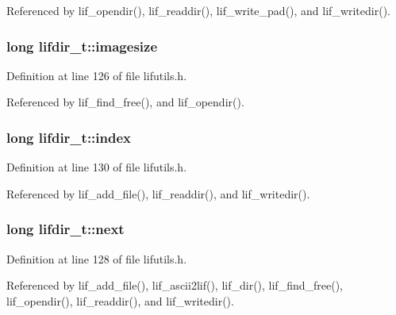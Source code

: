 Referenced by lif\+\_\+opendir(), lif\+\_\+readdir(), lif\+\_\+write\+\_\+pad(), and lif\+\_\+writedir().

\subsubsection[{\texorpdfstring{imagesize}{imagesize}}]{\setlength{\rightskip}{0pt plus 5cm}long lifdir\+\_\+t\+::imagesize}\hypertarget{structlifdir__t_a2cae1515444f013eaf439333e3952b1d}{}\label{structlifdir__t_a2cae1515444f013eaf439333e3952b1d}


Definition at line 126 of file lifutils.\+h.



Referenced by lif\+\_\+find\+\_\+free(), and lif\+\_\+opendir().

\subsubsection[{\texorpdfstring{index}{index}}]{\setlength{\rightskip}{0pt plus 5cm}long lifdir\+\_\+t\+::index}\hypertarget{structlifdir__t_a7b9b45ee1a56ba386158da051605a8bd}{}\label{structlifdir__t_a7b9b45ee1a56ba386158da051605a8bd}


Definition at line 130 of file lifutils.\+h.



Referenced by lif\+\_\+add\+\_\+file(), lif\+\_\+readdir(), and lif\+\_\+writedir().

\subsubsection[{\texorpdfstring{next}{next}}]{\setlength{\rightskip}{0pt plus 5cm}long lifdir\+\_\+t\+::next}\hypertarget{structlifdir__t_a52a7520a6393d4782afb0ccd42899215}{}\label{structlifdir__t_a52a7520a6393d4782afb0ccd42899215}


Definition at line 128 of file lifutils.\+h.



Referenced by lif\+\_\+add\+\_\+file(), lif\+\_\+ascii2lif(), lif\+\_\+dir(), lif\+\_\+find\+\_\+free(), lif\+\_\+opendir(), lif\+\_\+readdir(), and lif\+\_\+writedir().

